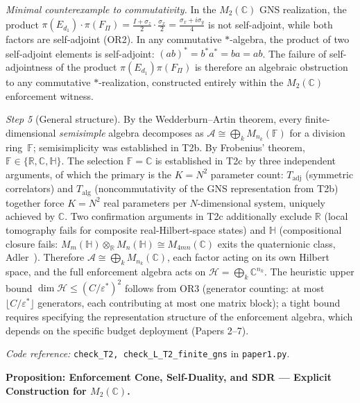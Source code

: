 \documentclass[11pt]{article}
\theoremstyle{remark}
\newcommand{\coderef}[2]{\smallskip\noindent\textit{Code reference:} \texttt{#1} in \texttt{#2}.}
\begin{document}
\begin{tcolorbox}[apfbox, title={T2: Noncommutativity $\to$ Operator Algebra on Hilbert Space}]
\textit{Minimal counterexample to commutativity.}  In the $M_2(\mathbb{C})$ GNS realization, the product $\pi(E_{d_1})\cdot\pi(F_\Pi) = \frac{I+\sigma_z}{2}\cdot\frac{\sigma_x}{2} = \frac{\sigma_x + i\sigma_y}{4}$ is not self-adjoint, while both factors are self-adjoint (OR2).  In any commutative $*$-algebra, the product of two self-adjoint elements is self-adjoint: $(ab)^* = b^*a^* = ba = ab$.  The failure of self-adjointness of the product $\pi(E_{d_1})\pi(F_\Pi)$ is therefore an algebraic obstruction to any commutative $*$-realization, constructed entirely within the $M_2(\mathbb{C})$ enforcement witness.

\textit{Step 5} (General structure).  By the Wedderburn--Artin theorem, every finite-dimensional \emph{semisimple} algebra decomposes as $\mathcal{A} \cong \bigoplus_k M_{n_k}(\mathbb{F})$ for a division ring~$\mathbb{F}$; semisimplicity was established in T2b.  By Frobenius' theorem, $\mathbb{F} \in \{\mathbb{R}, \mathbb{C}, \mathbb{H}\}$.  The selection $\mathbb{F} = \mathbb{C}$ is established in T2c by three independent arguments, of which the primary is the $K = N^2$ parameter count: $T_{\mathrm{adj}}$ (symmetric correlators) and $T_{\mathrm{alg}}$ (noncommutativity of the GNS representation from T2b) together force $K = N^2$ real parameters per $N$-dimensional system, uniquely achieved by $\mathbb{C}$.  Two confirmation arguments in T2c additionally exclude $\mathbb{R}$ (local tomography fails for composite real-Hilbert-space states) and $\mathbb{H}$ (compositional closure fails: $M_m(\mathbb{H}) \otimes_{\mathbb{R}} M_n(\mathbb{H}) \cong M_{4mn}(\mathbb{C})$ exits the quaternionic class, Adler~\cite{Adler1995}).  Therefore $\mathcal{A} \cong \bigoplus_k M_{n_k}(\mathbb{C})$, each factor acting on its own Hilbert space, and the full enforcement algebra acts on $\mathcal{H} = \bigoplus_k \mathbb{C}^{n_k}$.  The heuristic upper bound $\dim \mathcal{H} \le (C/\varepsilon^*)^2$ follows from OR3 (generator counting: at most $\lfloor C/\varepsilon^* \rfloor$ generators, each contributing at most one matrix block); a tight bound requires specifying the representation structure of the enforcement algebra, which depends on the specific budget deployment (Papers 2--7).

\coderef{check\_T2, check\_L\_T2\_finite\_gns}{paper1.py}
\end{tcolorbox}


\medskip\noindent\textbf{Proposition: Enforcement Cone, Self-Duality, and SDR — Explicit Construction for $M_2(\mathbb{C})$.}
\end{document}
